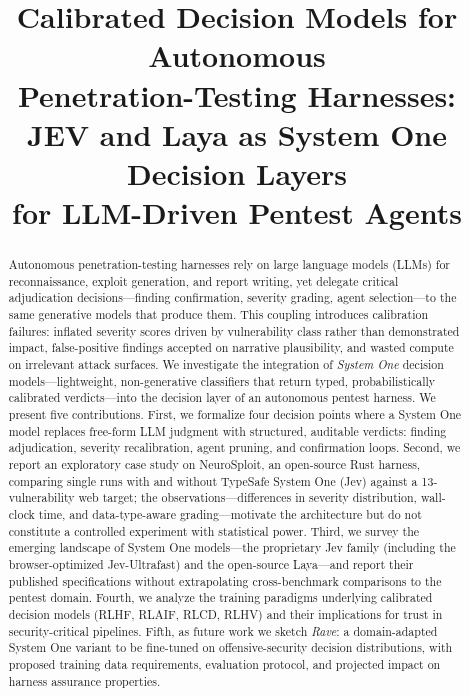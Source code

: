 \documentclass[conference]{IEEEtran}
\begin{document}
\title{Calibrated Decision Models for Autonomous\\Penetration-Testing Harnesses:\\JEV and Laya as System One Decision Layers\\for LLM-Driven Pentest Agents}

\author{
}

\maketitle

\begin{abstract}
Autonomous penetration-testing harnesses rely on large language models (LLMs) for reconnaissance, exploit generation, and report writing, yet delegate critical adjudication decisions---finding confirmation, severity grading, agent selection---to the same generative models that produce them. This coupling introduces calibration failures: inflated severity scores driven by vulnerability class rather than demonstrated impact, false-positive findings accepted on narrative plausibility, and wasted compute on irrelevant attack surfaces. We investigate the integration of \emph{System One} decision models---lightweight, non-generative classifiers that return typed, probabilistically calibrated verdicts---into the decision layer of an autonomous pentest harness. We present five contributions. First, we formalize four decision points where a System One model replaces free-form LLM judgment with structured, auditable verdicts: finding adjudication, severity recalibration, agent pruning, and confirmation loops. Second, we report an exploratory case study on NeuroSploit, an open-source Rust harness, comparing single runs with and without TypeSafe System One (Jev) against a 13-vulnerability web target; the observations---differences in severity distribution, wall-clock time, and data-type-aware grading---motivate the architecture but do not constitute a controlled experiment with statistical power. Third, we survey the emerging landscape of System One models---the proprietary Jev family (including the browser-optimized Jev-Ultrafast) and the open-source Laya---and report their published specifications without extrapolating cross-benchmark comparisons to the pentest domain. Fourth, we analyze the training paradigms underlying calibrated decision models (RLHF, RLAIF, RLCD, RLHV) and their implications for trust in security-critical pipelines. Fifth, as future work we sketch \emph{Rave}: a domain-adapted System One variant to be fine-tuned on offensive-security decision distributions, with proposed training data requirements, evaluation protocol, and projected impact on harness assurance properties.
\end{abstract}
\end{document}
